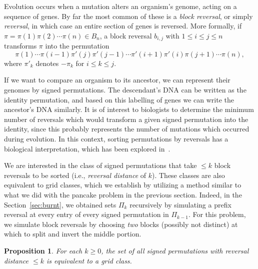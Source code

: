 \documentclass{article}
\numberwithin{equation}{section}
\newtheorem{prop}[thm]{Proposition}
\theoremstyle{definition}
\begin{document}
Evolution occurs when a mutation alters an organism's genome, acting on a sequence of genes.  By far the most common of these is a \emph{block reversal}, or simply \emph{reversal}, in which case an entire section of genes is reversed. More formally, if $\pi=\pi(1)\pi(2)\cdots\pi(n)\in B_n$, a block reversal $b_{i,j}$ with $1\leq i\leq j\leq n$ transforms $\pi$ into the permutation 
\[
\pi(1)\cdots\pi(i-1)\pi'(j)\pi'(j-1)\cdots\pi'(i+1)\pi'(i)\pi(j+1)\cdots\pi(n),
\] where $\pi'_k$ denotes $-\pi_k$ for $i\leq k\leq j$.

If we want to compare an organism to its ancestor, we can represent their genomes by signed permutations.  The descendant's DNA can be written as the identity permutation, and based on this labelling of genes we can write the ancestor's DNA similarly.  It is of interest to biologists to determine the minimum number of reversals which would transform a given signed permutation into the identity, since this probably represents the number of mutations which occurred during evolution. In this context, sorting permutations by reversals has a biological interpretation, which has been explored in~\cite{CohenBlum, HannenPev, H08}.

We are interested in the class of signed permutations that take $\leq k$ block reversals to be sorted (i.e., \emph{reversal distance} of $k$).  These classes are also equivalent to grid classes, which we establish by utilizing a method similar to what we did with the pancake problem in the previous section. Indeed, in the Section~\ref{sec:burnt}, we obtained sets $\Pi_k$ recursively by simulating a prefix reversal at every entry of every signed permutation in $\Pi_{k-1}$.  For this problem, we simulate block reversals by choosing \emph{two} blocks (possibly not distinct) at which to split and invert the middle portion.


\begin{prop}
For each $k\geq0$, the set of all signed permutations with reversal distance $\leq k$ is equivalent to a grid class.
\end{prop}
\end{document}
